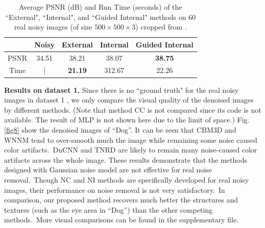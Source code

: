 \begin{table}\vspace{-4mm}
\caption{Average PSNR (dB) and Run Time (seconds) of the ``External", ``Internal", and ``Guided Internal" methods on 60 real noisy images (of size $500\times500\times3$) cropped from \cite{crosschannel2016}.}
\vspace{-4mm}
\label{tab1}
\begin{center}
\renewcommand\arraystretch{1}
\begin{tabular}{|c||c|c|c|c|}
\hline
 & \small\textbf{Noisy} &\small \textbf{External} & \small\textbf{Internal} & \small\textbf{Guided Internal}  
\\
\hline
PSNR & 34.51 & 38.21 & 38.07 & \textbf{38.75} 
\\
\hline
Time & | &  \textbf{21.19}  & 312.67 & 22.26
\\
\hline
\end{tabular}
\end{center}
\vspace{-3mm}
\end{table}

\textbf{Results on dataset 1.}
Since there is no ``ground truth" for the real noisy images in  dataset 1 \cite{ncwebsite}, we only compare the visual quality of the denoised images by different methods. (Note that method CC \cite{crosschannel2016} is not compared since its code is not available. The result of MLP is not shown here due to the limit of space.) Fig. \ref{fig8} show the denoised images of ``Dog''. It can be seen that CBM3D and WNNM tend to over-smooth much the image while remaining some noise caused color artifacts.\ DnCNN and TNRD are likely to remain many noise-caused color artifacts across the whole image. These results demonstrate that the methods designed with Gaussian noise model are not effective for real noise removal.\ Though NC and NI methods are specifically developed for real noisy images, their performance on noise removal is not very satisfactory.\ In comparison, our proposed method recovers much better the structures and textures (such as the eye area in ``Dog'') than the other competing methods.\ More visual comparisons can be found in the supplementary file.


